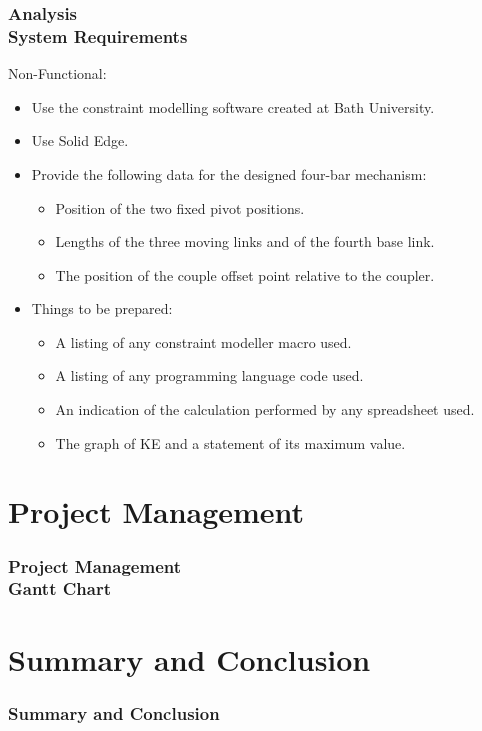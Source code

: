 \documentclass[ucs,10pt]{beamer}
\begin{document}
\begin{frame}
\frametitle{Analysis \\
    \small \color{rwth-blue} System Requirements}
    Non-Functional:
    \begin{itemize}
        \item Use the constraint modelling software created at Bath University.
        \item Use Solid Edge.
        \item Provide the following data for the designed four-bar mechanism:
        \begin{itemize}
            \item Position of the two fixed pivot positions.
            \item Lengths of the three moving links and of the fourth base link.
            \item The position of the couple offset point relative to the coupler.
        \end{itemize}
        \item Things to be prepared:
        \begin{itemize}
            \item A listing of any constraint modeller macro used.
            \item A listing of any programming language code used.
            \item An indication of the calculation performed by any spreadsheet used.
            \item The graph of KE and a statement of its maximum value.
        \end{itemize}
    \end{itemize}
\end{frame}



\section{Project Management}



\begin{frame}
\frametitle{Project Management \\
    \small \color{rwth-blue} Gantt Chart}
\end{frame}



\section{Summary and Conclusion}

\begin{frame}
\frametitle{Summary and Conclusion}
\end{frame}
\end{document}
